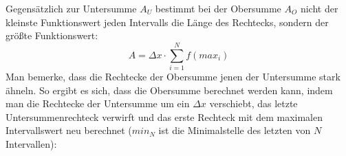 \begin{figure}[h!]
\end{figure}

Gegens\"{a}tzlich zur Untersumme $A_U$ bestimmt bei der Obersumme $A_O$ nicht der kleinste Funktionswert jeden Intervalls die L\"{a}nge des Rechtecks, sondern der gr\"{o}\ss{}te Funktionswert: $$A = \Delta x \cdot \sum_{i=1}^{N} f(max_i)$$ Man bemerke, dass die Rechtecke der Obersumme jenen der Untersumme stark \"{a}hneln. So ergibt es sich, dass die Obersumme berechnet werden kann, indem man die Rechtecke der Untersumme um ein $\Delta x$ verschiebt, das letzte Untersummenrechteck verwirft und das erste Rechteck mit dem maximalen Intervallswert neu berechnet ($min_N$ ist die Minimalstelle des letzten von $N$ Intervallen):

